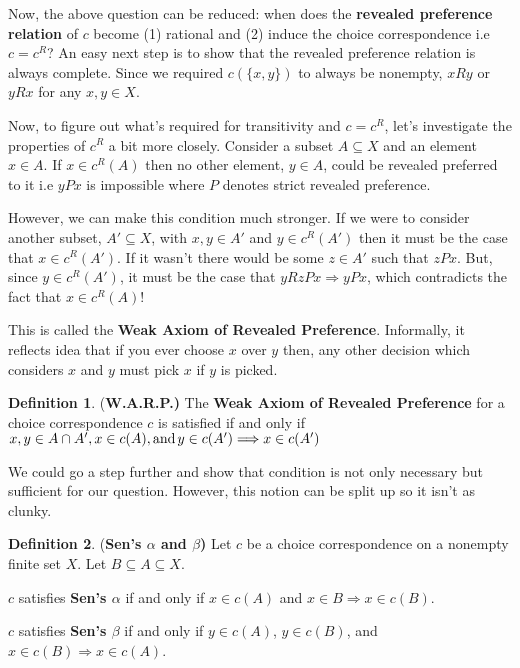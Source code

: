 \documentclass[12pt]{article}
\theoremstyle{plain}
\theoremstyle{definition}
\newtheorem{defin}{Definition}[subsection]
\theoremstyle{remark}
\newcommand{\tn}[1]{\textnormal{#1}}
\newcommand{\3}{\vspace*{3mm}}
\newcommand{\name}[1]{\tn{(\textbf{#1)}}}
\newcommand{\intersect}{\cap}
\newcommand{\RIGHT}{\Longrightarrow}
\begin{document}
Now, the above question can be reduced: when does the \textbf{revealed preference relation} of $c$ become (1) rational and (2) induce the choice correspondence i.e $c = c^R$? An easy next step is to show that the revealed preference relation is always complete. Since we required $c(\{x,y\})$ to always be nonempty, $x R y$ or $y R x$ for any $x,y \in X$. 

Now, to figure out what's required for transitivity and $c = c^R$, let's investigate the properties of $c^R$ a bit more closely. Consider a subset $A \subseteq X$ and an element $x \in A$. If $x \in c^R(A)$ then no other element, $y \in A$, could be revealed preferred to it i.e $y P x$ is impossible where $P$ denotes strict revealed preference. 


However, we can make this condition much stronger. If we were to consider another subset, $A'  \subseteq X$, with $x, y \in A'$ and $y \in c^R(A')$ then it must be the case that $x \in c^R(A')$. If it wasn't there would be some $z \in A'$ such that $z P x$. But, since $y \in c^R(A')$, it must be the case that $y R z P x \RIGHT y P x$, which contradicts the fact that $x \in c^R(A)$! 


\quad  This is called the \textbf{Weak Axiom of Revealed Preference}. Informally, it reflects idea that if you ever choose $x$ over $y$ then, any other decision which considers $x$ and $y$ must pick $x$ if $y$ is picked. 
\begin{defin} \name{W.A.R.P.}
The \textbf{Weak Axiom of Revealed Preference} for a choice correspondence $c$ is satisfied if and only if $x,y \in A \intersect A', x \in c(A), \tn{and} \hspace*{.5mm} y \in c(A') \RIGHT x \in c(A') $

\end{defin}

We could go a step further and show that condition is not only necessary but sufficient for our question. However, this notion can be split up so it isn't as clunky.

\newpage

\begin{defin} \name{Sen's $\alpha$ and $\beta$}
Let $c$ be a choice correspondence on a nonempty finite set $X$. Let $B \subseteq A \subseteq X$.


$c$ satisfies \textbf{Sen's $\alpha$} if and only if $x \in c(A)$ and $x \in B \RIGHT x \in c(B)$.


$c$ satisfies \textbf{Sen's $\beta$} if and only if $y \in c(A)$, $y \in c(B)$, and $x \in c(B) \RIGHT x \in c(A)$. 

\end{defin}
\end{document}
